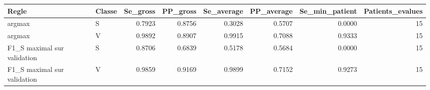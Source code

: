 \begin{tabular}{llrrrrrr}
\toprule
Regle & Classe & Se_gross & PP_gross & Se_average & PP_average & Se_min_patient & Patients_evalues \\
\midrule
argmax & S & 0.7923 & 0.8756 & 0.3028 & 0.5707 & 0.0000 & 15 \\
argmax & V & 0.9892 & 0.8907 & 0.9915 & 0.7088 & 0.9333 & 15 \\
F1_S maximal sur validation & S & 0.8706 & 0.6839 & 0.5178 & 0.5684 & 0.0000 & 15 \\
F1_S maximal sur validation & V & 0.9859 & 0.9169 & 0.9899 & 0.7152 & 0.9273 & 15 \\
\bottomrule
\end{tabular}
